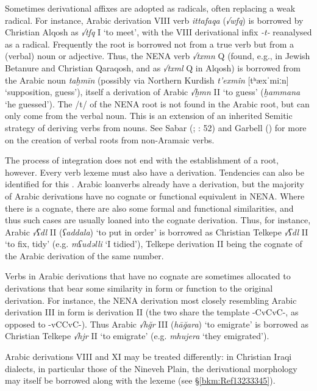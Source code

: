\documentclass[output=paper]{langsci/langscibook}
\begin{document}
Sometimes derivational affixes are adopted as radicals, often replacing a weak radical. For instance, Arabic derivation VIII verb \textit{ittafaqa} (\textit{√wfq}) is borrowed by Christian Alqosh as \textit{√tfq} I ‘to meet’, with the VIII derivational infix \textit{\nobreakdash-t\nobreakdash-} reanalysed as a radical. Frequently the root is borrowed not from a true verb but from a (verbal) noun or adjective. Thus, the NENA verb \textit{√txmn} Q (found, e.g., in Jewish Betanure and Christian Qaraqosh, and as \textit{√txml} Q in Alqosh) is borrowed from the Arabic noun \textit{taḫmīn} (possibly via Northern Kurdish \textit{t’exmîn} [tʰæxˈmiːn] ‘supposition, guess’), itself a derivation of Arabic \textit{√ḫmn} II ‘to guess’ (\textit{ḫammana} ‘he guessed’). The /t/ of the NENA root is not found in the Arabic root, but can only come from the verbal noun. This is an extension of an inherited Semitic strategy of deriving verbs from nouns. See Sabar (\citeyear{Sabar1984}; \citeyear{Sabar2002}: 52) and Garbell (\citeyear[166]{Garbell1965}) for more on the creation of verbal roots from non-Aramaic verbs.

The process of integration does not end with the establishment of a root, however. Every verb lexeme must also have a derivation. Tendencies can also be identified for this \citep{Coghill2015}. Arabic loanverbs already have a derivation, but the majority of Arabic derivations have no cognate or functional equivalent in NENA. Where there is a cognate, there are also some formal and functional similarities, and thus such cases are usually loaned into the cognate derivation. Thus, for instance, Arabic \textit{√ʕdl} II (\textit{ʕaddala}) ‘to put in order’ is borrowed as Christian Telkepe \textit{√ʕdl} II ‘to fix, tidy’ (e.g. \textit{mʕudəlli} ‘I tidied’), Telkepe derivation II being the cognate of the Arabic derivation of the same number.

Verbs in Arabic derivations that have no cognate are sometimes allocated to derivations that bear some similarity in form or function to the original derivation. For instance, the NENA derivation most closely resembling Arabic derivation III in form is derivation II (the two share the template -CvCvC-, as opposed to -vCCvC-). Thus Arabic \textit{√hğr} III (\textit{hāğara}) ‘to emigrate’ is borrowed as Christian Telkepe \textit{√hjr} II ‘to emigrate’ (e.g. \textit{mhujera} ‘they emigrated’).

Arabic derivations VIII and XI may be treated differently: in Christian Iraqi dialects, in particular those of the Nineveh Plain, the derivational morphology may itself be borrowed along with the lexeme (see §\ref{bkm:Ref13233345}).
\end{document}
